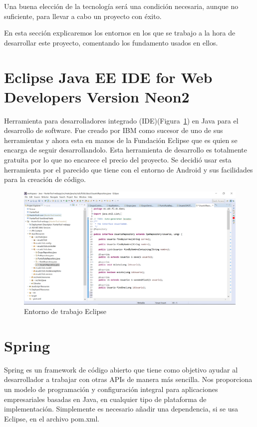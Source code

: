
Una buena elección de la tecnología será una condición necesaria, aunque no suficiente, para llevar a cabo un proyecto con éxito.

En esta sección explicaremos los entornos en los que se trabajo a la hora de desarrollar este proyecto, comentando los fundamento usados en ellos. 

\section{Eclipse Java EE IDE for Web Developers Version Neon2 }
Herramienta para desarrolladores  integrado (IDE)(Figura~\ref{fig:eclipse})  en Java para el desarrollo de software. Fue creado por IBM como sucesor de uno de sus herramientas y ahora esta en manos de la Fundación Eclipse que es quien se encarga de seguir desarrollandolo.
 Esta herramienta de desarrollo es totalmente gratuita por lo que no encarece el precio del proyecto. Se decidió usar esta herramienta por el parecido que tiene con el entorno de Android y sus facilidades para la creación de código. 
\begin{figure}
		\centering
		\includegraphics[width=\textwidth] {eclipse.png}
		\caption{Entorno de trabajo Eclipse }
		\label{fig:eclipse}
	\end{figure}
	
	
	
\section{Spring}
Spring es un framework de código abierto que tiene como objetivo ayudar al desarrollador a trabajar con otras APIs de manera más sencilla. Nos proporciona un modelo de programación y configuración integral para aplicaciones empresariales basadas en Java, en cualquier tipo de plataforma de implementación. Simplemente es necesario añadir una dependencia, si se usa Eclipse, en el archivo pom.xml. 


